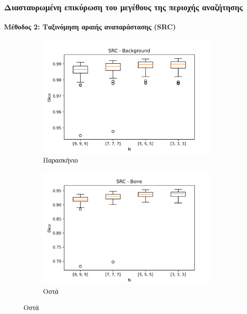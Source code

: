 \documentclass{beamer}
\begin{document}
\begin{frame}
\frametitle{Διασταυρωμένη επικύρωση του μεγέθους της περιοχής αναζήτησης}
\framesubtitle{Μέθοδος 2: Ταξινόμηση αραιής αναπαράστασης (SRC)}

\begin{figure}[H]
    \centering

    \begin{subfigure}[b]{0.42\linewidth}
    \includegraphics[width=\linewidth]{SRC_N_Background_plot.png}
    \caption{Παρασκήνιο}
    \end{subfigure}
    \begin{subfigure}[b]{0.42\linewidth}
    \includegraphics[width=\linewidth]{SRC_N_Bone_plot.png}
    \caption{Οστά}
    \end{subfigure}


\end{figure}
\end{frame}
\end{document}
